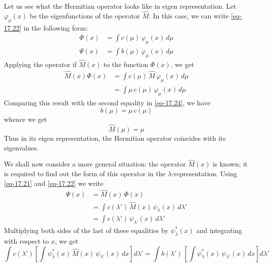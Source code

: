 \documentclass[a4paper,sfsidenotes,colorlinks=true]{tufte-book}
\numberwithin{equation}{section}
\numberwithin{figure}{section}
\begin{document}
Let us see what the Hermitian operator looks like in eigen
representation. Let $\varphi_{\mu} (x)$ be the eigenfunctions of the
operator $\hat{M}$. In this case, we can write \ref{eq-17.22} in the
following form:
\begin{equation}%
\begin{split}
\Phi (x) & = \int c (\mu) \, \varphi_{\mu}(x) \, d \mu \\
\Psi (x) & = \int b (\mu) \, \varphi_{\mu}(x) \, d \mu 
\end{split}
\label{eq-17.24}
\end{equation}
Applying the operator if $\hat{M}(x)$ to the function $\Phi (x)$, we get
\begin{equation*}%
\begin{split}
\hat{M} (x) \Phi(x) & = \int c (\mu) \, \hat{M} \, \varphi_{\mu}(x) \,
d \mu \\
 & = \int \mu \, c (\mu) \, \varphi_{\mu}(x) \, d \mu 
\end{split}
\end{equation*}
Comparing this result with the second equality in \ref{eq-17.24}, we have 
\begin{equation}%
b (\mu) = \mu \, c (\mu)
\label{eq-17.25} 
\end{equation}
whence we get 
\begin{equation}%
\hat{M} (\mu) = \mu 
\label{eq-17.26} 
\end{equation}
Thus in its eigen representation, the Hermitian operator
coincides with its eigenvalues. 

We shall now consider a more general situation: the operator $\hat{M}(x)$
is known; it is required to find out the form of this operator in the
$\lambda$-representation. Using \ref{eq-17.21} and \ref{eq-17.22} we write
\begin{equation*}%
\begin{split}
\Psi(x) & =  \hat{M}(x) \, \Phi(x) \\
&= \int c(\lambda') \, \hat{M} (x) \, \psi_{\lambda} (x) \, d \lambda' \\
 & = \int c (\lambda') \, \psi_{\lambda'}(x) \, d \lambda' 
\end{split}
\end{equation*}
Multiplying both sides of the last of these equalities by $\psi^{*}_{\lambda} (x)$ and integrating with respect to $x$, we get 
\begin{equation*}%
\int c (\lambda') \left[ \int \psi^{*}_{\lambda} (x) \, \hat{M}(x) \,
  \psi_{\lambda'} (x) \, dx \right] d \lambda' = \int b(\lambda') \,
\left[ \int \psi^{*}_{\lambda} (x) \, \psi_{\lambda'}(x) \, dx \right]
d \lambda'
\end{equation*}
\end{document}
